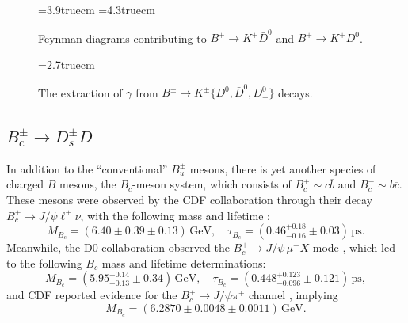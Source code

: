 \documentclass[12pt]{article}
\begin{document}
\begin{figure}
\begin{center}
\leavevmode
\epsfysize=3.9truecm 
 \hspace*{1truecm}
\epsfysize=4.3truecm 
\end{center}
\vspace*{-0.4truecm}
\caption{Feynman diagrams contributing to $B^+\to K^+\bar D^0$ and 
$B^+\to K^+D^0$. }\label{fig:BDK}
\end{figure}


\begin{figure}
\vspace*{0.3truecm}
\begin{center}
\leavevmode
\epsfysize=2.7truecm 
\end{center}
\vspace*{-0.6truecm}
\caption{The extraction of $\gamma$ from 
$B^\pm\to K^\pm\{D^0,\bar D^0,D^0_+\}$ 
decays.}\label{fig:BDK-triangle}
\end{figure}



%
%
%
\boldmath
\subsection{$B_c^\pm\to D_s^\pm D$}
\unboldmath
%
%
%
In addition to the ``conventional'' $B_u^\pm$ mesons, there is yet another 
species of charged $B$ mesons, the $B_c$-meson system, which consists of
$B_c^+\sim c\overline{b}$ and $B_c^-\sim b\overline{c}$. These mesons were 
observed by the CDF collaboration through their decay 
$B_c^+\to J/\psi \ell^+ \nu$, with the following mass and lifetime 
\cite{CDF-Bc}:
\begin{equation}
M_{B_c}=(6.40\pm0.39\pm0.13)\,\mbox{GeV}, \quad
\tau_{B_c}=(0.46^{+0.18}_{-0.16}\pm 0.03)\,\mbox{ps}.
\end{equation}
Meanwhile, the D0 collaboration observed the $B_c^+\to J/\psi\,\mu^+ X$ mode
\cite{D0-Bc}, which led to the following $B_c$ mass and lifetime determinations:
\begin{equation}
M_{B_c}=(5.95^{+0.14}_{-0.13}\pm0.34)\,\mbox{GeV}, \quad
\tau_{B_c}=(0.448^{+0.123}_{-0.096}\pm 0.121)\,\mbox{ps},
\end{equation}
and CDF reported evidence for the $B_c^+\to J/\psi \pi^+$ channel \cite{CDF-Bc-nl},
implying
\begin{equation}
M_{B_c}= (6.2870 \pm 0.0048  \pm 0.0011)\,\mbox{GeV}.
\end{equation}
\end{document}

